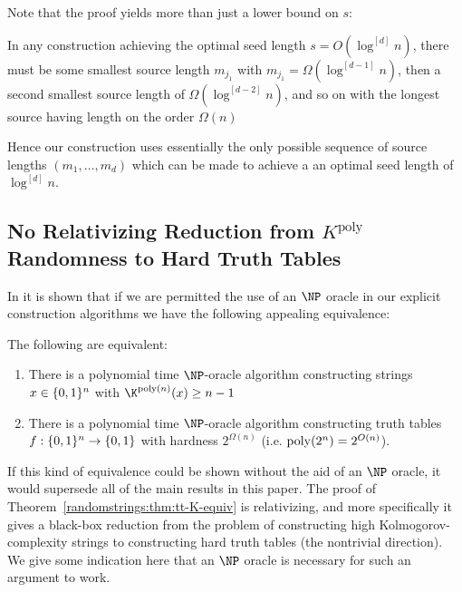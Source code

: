 Note that the proof yields more than just a lower bound on $s$: 
\begin{observation}
In any construction achieving the optimal seed length $s = O(\log^{[d]}n)$, there must be some smallest source length $m_{j_1}$ with $m_{j_1}=\Omega(\log^{[d-1]}n)$, then a second smallest source length of $\Omega(\log^{[d-2]}n)$, and so on with the longest source having length on the order $\Omega(n)$
\end{observation}
Hence our construction uses essentially the only possible sequence of source lengths $(m_1,\ldots,m_d)$ which can be made to achieve a an optimal seed length of $\log^{[d]}n$. 

\subsection{No Relativizing Reduction from $K^{\mathrm{poly}}$ Randomness to Hard Truth Tables}

In \cite{Korten21} it is shown that if we are permitted the use of an $\NP$ oracle in our explicit construction algorithms we have the following appealing equivalence:

\begin{theorem}\label{randomstrings:thm:tt-K-equiv}
The following are equivalent:
\begin{enumerate}
    \item There is a polynomial time $\NP$-oracle algorithm constructing strings $x \in \{0,1\}^n$ with $\K^{\poly(n)}(x) \geq n-1$
    \item There is a polynomial time $\NP$-oracle algorithm constructing truth tables $f: \{0,1\}^{n} \to \{0,1\}$ with hardness $2^{\Omega(n)}$ (i.e. $\mathrm{poly}(2^n) = 2^{O(n)}$).
\end{enumerate}
\end{theorem}

If this kind of equivalence could be shown without the aid of an $\NP$ oracle, it would supersede all of the main results in this paper. The proof of Theorem~\ref{randomstrings:thm:tt-K-equiv} is relativizing, and more specifically it gives a black-box reduction from the problem of constructing high Kolmogorov-complexity strings to constructing hard truth tables (the nontrivial direction). We give some indication here that an $\NP$ oracle is necessary for such an argument to work. 

